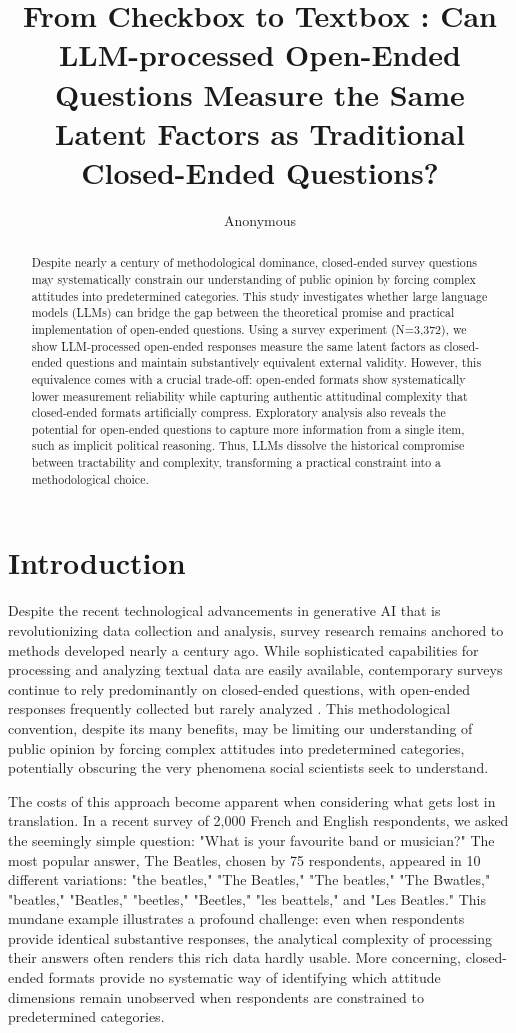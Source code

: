 \documentclass[
  journal=ram,
  manuscript=article-type,
  year=2025,
  volume=unpublished,
]{cup-journal}
\title{From Checkbox to Textbox : Can LLM-processed Open-Ended Questions Measure the Same Latent Factors as Traditional Closed-Ended Questions?}
\author{Anonymous}
\affiliation{Anonymous}
\begin{document}
\begin{abstract}
Despite nearly a century of methodological dominance, closed-ended survey questions may systematically constrain our understanding of public opinion by forcing complex attitudes into predetermined categories. This study investigates whether large language models (LLMs) can bridge the gap between the theoretical promise and practical implementation of open-ended questions. Using a survey experiment (N=3,372), we show LLM-processed open-ended responses measure the same latent factors as closed-ended questions and maintain substantively equivalent external validity. However, this equivalence comes with a crucial trade-off: open-ended formats show systematically lower measurement reliability while capturing authentic attitudinal complexity that closed-ended formats artificially compress. Exploratory analysis also reveals the potential for open-ended questions to capture more information from a single item, such as implicit political reasoning. Thus, LLMs dissolve the historical compromise between tractability and complexity, transforming a practical constraint into a methodological choice.
\end{abstract}

\section{Introduction}

Despite the recent technological advancements in generative AI that is revolutionizing data collection and analysis, survey research remains anchored to methods developed nearly a century ago.
While sophisticated capabilities for processing and analyzing textual data are easily available, contemporary surveys continue to rely predominantly on closed-ended questions, with open-ended responses frequently collected but rarely analyzed \citep{roberts_etal14}.
This methodological convention, despite its many benefits, may be limiting our understanding of public opinion by forcing complex attitudes into predetermined categories, potentially obscuring the very phenomena social scientists seek to understand.

The costs of this approach become apparent when considering what gets lost in translation.
In a recent survey of 2,000 French and English respondents, we asked the seemingly simple question: "What is your favourite band or musician?"
The most popular answer, The Beatles, chosen by 75 respondents, appeared in 10 different variations: "the beatles," "The Beatles," "The beatles," "The Bwatles," "beatles," "Beatles," "beetles," "Beetles," "les beattels," and "Les Beatles."
This mundane example illustrates a profound challenge: even when respondents provide identical substantive responses, the analytical complexity of processing their answers often renders this rich data hardly usable.
More concerning, closed-ended formats provide no systematic way of identifying which attitude dimensions remain unobserved when respondents are constrained to predetermined categories.
\end{document}
